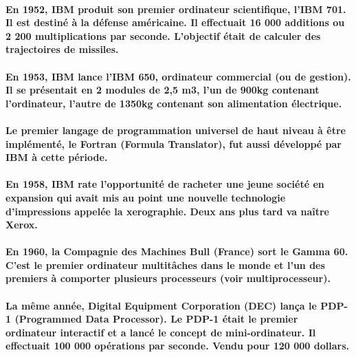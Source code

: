 \paragraph{
  En 1952, IBM produit son premier ordinateur scientifique, l'IBM 701. Il est destiné à la défense américaine. Il effectuait 16 000 additions ou 2 200 multiplications par seconde. L'objectif était de calculer des trajectoires de missiles.
}

\paragraph{
  En 1953, IBM lance l'IBM 650, ordinateur commercial (ou de gestion). Il se présentait en 2 modules de 2,5 m3, l'un de 900kg contenant l'ordinateur, l'autre de 1350kg contenant son alimentation électrique.
}

\paragraph{
  Le premier langage de programmation universel de haut niveau à être implémenté, le Fortran (Formula Translator), fut aussi développé par IBM à cette période.
}

\paragraph{
  En 1958, IBM rate l'opportunité de racheter une jeune société en expansion qui avait mis au point une nouvelle technologie d'impressions appelée la xerographie. Deux ans plus tard va naître Xerox.
}

\paragraph{
  En 1960, la Compagnie des Machines Bull (France) sort le Gamma 60. C'est le premier ordinateur multitâches dans le monde et l'un des premiers à comporter plusieurs processeurs (voir multiprocesseur).
}

\paragraph{
  La même année, Digital Equipment Corporation (DEC) lança le PDP-1 (Programmed Data Processor). Le PDP-1 était le premier ordinateur interactif et a lancé le concept de mini-ordinateur. Il effectuait 100 000 opérations par seconde. Vendu pour 120 000 dollars.
}
